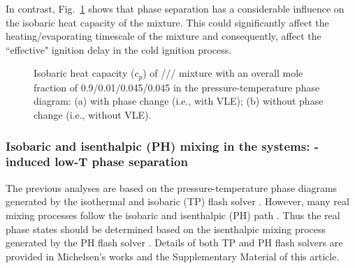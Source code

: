     In contrast, Fig.~\ref{fig:PTdiagram_cp} shows that phase separation has a considerable influence on the isobaric heat capacity of the mixture. This could significantly affect the heating/evaporating timescale of the mixture and consequently, affect the ``effective" ignition delay in the cold ignition process.

    \begin{figure}[htb]
        \centering


        \caption{Isobaric heat capacity ($c_p$) of /// mixture with an overall mole fraction of 0.9/0.01/0.045/0.045 in the pressure-temperature phase diagram: (a) with phase change (i.e., with VLE); (b) without phase change (i.e., without VLE).}
        \label{fig:PTdiagram_cp}
    \end{figure}


\subsubsection{Isobaric and isenthalpic (PH) mixing in the  systems: -induced low-T phase separation} \label{sec:results:combustor:HPn}
The previous analyses %
are based on the pressure-temperature phase diagrams generated by the isothermal and isobaric (TP) flash solver \cite{michelsen1982isothermal}.
However, many real mixing processes follow the isobaric and isenthalpic (PH) path \cite{serrano2018development}. Thus the real phase states should be determined based on the isenthalpic mixing process generated by the PH flash solver \cite{michelsen1987multiphase}. Details of both TP and PH flash solvers are provided in Michelsen's works \cite{michelsen1982isothermal,michelsen1987multiphase} and the Supplementary Material of this article.

